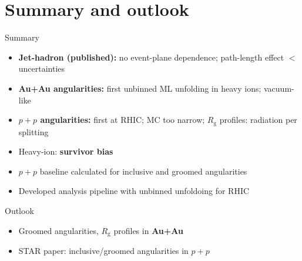 \documentclass[10pt, aspectratio=169]{beamer}
\newcommand{\Rg}{\ensuremath{R_\mathrm{g}}\xspace}
\begin{document}
\section{Summary and outlook}

\begin{frame}{Summary}
	\small
	\begin{itemize}
		\item \textbf{Jet-hadron (published):} no event-plane dependence; path-length effect \(<\) uncertainties
		\item<2-> \textbf{Au+Au angularities:} first unbinned ML unfolding in heavy ions; vacuum-like
		\item<3-> \textbf{\(p+p\) angularities:} first at RHIC; MC too narrow; \Rg profiles: radiation per splitting
		\item<4-> Heavy-ion: \textbf{survivor bias}
		\item<5-> \(p+p\) baseline calculated for inclusive and groomed angularities
		\item<6-> Developed analysis pipeline with unbinned unfoldoing for RHIC
	\end{itemize}
\end{frame}

\begin{frame}{Outlook}
	\begin{itemize}
		\item Groomed angularities, \Rg profiles in \textbf{Au+Au}
		\item<3-> STAR paper: inclusive/groomed angularities in \(p+p\)
	\end{itemize}
\end{frame}
\end{document}
